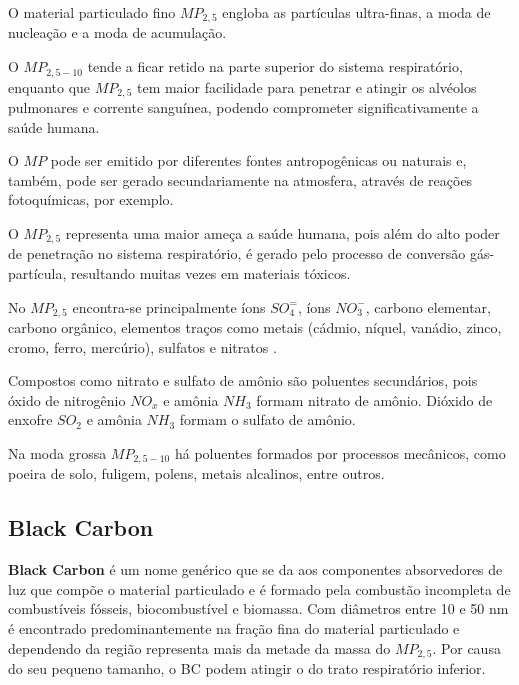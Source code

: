 O material particulado fino $MP_{2,5}$ engloba as partículas 
ultra-finas, a moda de nucleação e a moda de acumulação.  

O $MP_{2,5-10}$ tende a ficar retido na parte superior do sistema respiratório, 
enquanto que $MP_{2,5}$ tem maior facilidade para penetrar e atingir 
os alvéolos pulmonares e corrente sanguínea, 
podendo comprometer significativamente a saúde humana. 

O $MP$ pode ser emitido por diferentes fontes antropogênicas ou naturais e, 
também, pode ser gerado secundariamente na atmosfera, através de 
reações fotoquímicas, por exemplo. 

O $MP_{2,5}$ representa uma maior ameça a saúde humana, pois além 
do alto poder de penetração no sistema respiratório,
é gerado pelo processo de conversão gás-partícula, resultando muitas
vezes em materiais tóxicos.

No $MP_{2,5}$ encontra-se principalmente íons $SO_4^=$, 
íons $ NO_3^-$, carbono elementar, carbono orgânico, 
elementos traços como metais 
(cádmio, níquel, vanádio, zinco, cromo, ferro, mercúrio), 
sulfatos e nitratos \citep{finlayson1999}. 

Compostos como nitrato e sulfato de amônio são poluentes secundários,
pois óxido de nitrogênio $NO_x$ e amônia $NH_3$ formam nitrato de amônio. 
Dióxido de enxofre $SO_2$ e amônia $NH_3$ formam o sulfato de amônio. 

Na moda grossa $MP_{2,5-10}$ há poluentes formados por processos mecânicos, 
como poeira de solo, fuligem, polens, metais alcalinos, entre outros.%

\subsection{Black Carbon}

\textbf{Black Carbon} é um nome genérico que se da aos componentes
absorvedores de luz que compõe o material particulado e é formado pela combustão
incompleta de combustíveis fósseis, biocombustível e biomassa.
Com diâmetros entre 10 e 50 nm é encontrado predominantemente na fração fina 
do material particulado e dependendo da região representa mais da metade 
da massa do $MP_{2,5}$. Por causa do seu pequeno tamanho, o BC podem atingir o
do trato respiratório inferior.

